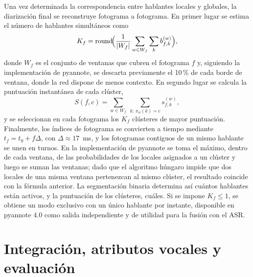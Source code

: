 \documentclass[11pt,a4paper]{article}
\begin{document}
Una vez determinada la correspondencia entre hablantes locales y globales, la diarización final se reconstruye fotograma a fotograma. En primer lugar se estima el número de hablantes simultáneos como
\begin{equation}
K_f=\operatorname{round}\!\Bigl(\frac{1}{|W_f|}\sum_{w\in W_f}\sum_{k}b^{(w)}_{f,k}\Bigr),
\end{equation}
donde $W_f$ es el conjunto de ventanas que cubren el fotograma $f$ y, siguiendo la implementación de pyannote, se descarta previamente el 10\,\% de cada borde de ventana, donde la red dispone de menos contexto. En segundo lugar se calcula la puntuación instantánea de cada clúster,
\begin{equation}
S(f,c)=\sum_{w\in W_f}\ \sum_{k:\,\pi_w(k)=c}s^{(w)}_{f,k},
\end{equation}
y se seleccionan en cada fotograma los $K_f$ clústeres de mayor puntuación. Finalmente, los índices de fotograma se convierten a tiempo mediante $t_f=t_0+f\Delta$, con $\Delta\approx17$~ms, y los fotogramas contiguos de un mismo hablante se unen en turnos. En la implementación de pyannote se toma el máximo, dentro de cada ventana, de las probabilidades de los locales asignados a un clúster y luego se suman las ventanas; dado que el algoritmo húngaro impide que dos locales de una misma ventana pertenezcan al mismo clúster, el resultado coincide con la fórmula anterior. La segmentación binaria determina así cuántos hablantes están activos, y la puntuación de los clústeres, cuáles. Si se impone $K_f\le1$, se obtiene un modo exclusivo con un único hablante por instante, disponible en pyannote 4.0 como salida independiente y de utilidad para la fusión con el ASR.

\section{Integración, atributos vocales y evaluación}
\label{sec:integracion}
\end{document}
